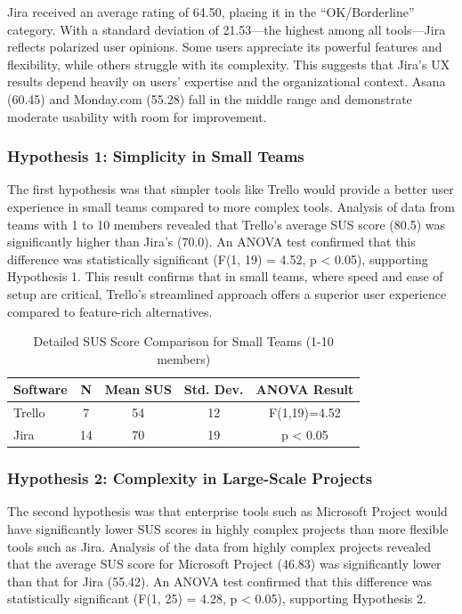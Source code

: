 \documentclass[runningheads]{llncs}
\begin{document}
Jira received an average rating of 64.50, placing it in the “OK/Borderline” category. With a standard deviation of 21.53—the highest among all tools—Jira reflects polarized user opinions. Some users appreciate its powerful features and flexibility, while others struggle with its complexity. This suggests that Jira’s UX results depend heavily on users’ expertise and the organizational context. Asana (60.45) and Monday.com (55.28) fall in the middle range and demonstrate moderate usability with room for improvement.



\subsubsection{Hypothesis 1: Simplicity in Small Teams}
The first hypothesis was that simpler tools like Trello would provide a better user experience in small teams compared to more complex tools. Analysis of data from teams with 1 to 10 members revealed that Trello’s average SUS score (80.5) was significantly higher than Jira’s (70.0). An ANOVA test confirmed that this difference was statistically significant (F(1, 19) = 4.52, p < 0.05), supporting Hypothesis 1. This result confirms that in small teams, where speed and ease of setup are critical, Trello’s streamlined approach offers a superior user experience compared to feature-rich alternatives.

\begin{table}[h]
\caption{Detailed SUS Score Comparison for Small Teams (1-10 members)}
\centering
\begin{tabular}{l c c c c}
\toprule
\textbf{Software} & \textbf{N} & \textbf{Mean SUS} & \textbf{Std. Dev.} & \textbf{ANOVA Result} \\
\midrule
Trello & 7 & 54 & 12 & F(1,19)=4.52 \\
Jira & 14 & 70 & 19 & p < 0.05 \\
\bottomrule
\end{tabular}
\end{table}


\subsubsection{Hypothesis 2: Complexity in Large-Scale Projects}
The second hypothesis was that enterprise tools such as Microsoft Project would have significantly lower SUS scores in highly complex projects than more flexible tools such as Jira. Analysis of the data from highly complex projects revealed that the average SUS score for Microsoft Project (46.83) was significantly lower than that for Jira (55.42). An ANOVA test confirmed that this difference was statistically significant (F(1, 25) = 4.28, p < 0.05), supporting Hypothesis 2.
\end{document}
